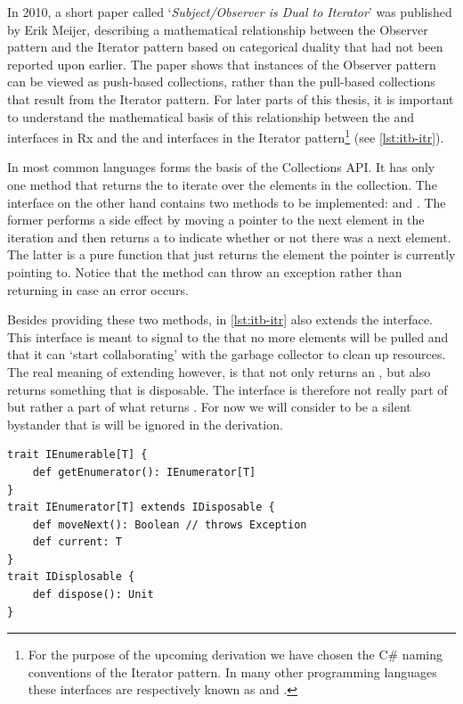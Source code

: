 In 2010, a short paper called `\textit{Subject/Observer is Dual to Iterator}' \cite{meijer2010-Observable} was published by Erik Meijer, describing a mathematical relationship between the Observer pattern and the Iterator pattern based on categorical duality that had not been reported upon earlier. The paper shows that instances of the Observer pattern can be viewed as push-based collections, rather than the pull-based collections that result from the Iterator pattern. For later parts of this thesis, it is important to understand the mathematical basis of this relationship between the \obs and \obv interfaces in Rx and the \ieb and \ier interfaces in the Iterator pattern\footnote{For the purpose of the upcoming derivation we have chosen the C\# naming conventions of the Iterator pattern. In many other programming languages these interfaces are respectively known as  and .} (see \autoref{lst:itb-itr}).

In most common languages \ieb forms the basis of the Collections API. It has only one method  that returns the \ier to iterate over the elements in the collection. The \ier interface on the other hand contains two methods to be implemented:  and . The former performs a side effect by moving a pointer to the next element in the iteration and then returns a  to indicate whether or not there was a next element. The latter is a pure function that just returns the element the pointer is currently pointing to. Notice that the  method can throw an exception rather than returning  in case an error occurs.

Besides providing these two methods, \ier in \autoref{lst:itb-itr} also extends the \id interface. This interface is meant to signal to the \ieb that no more elements will be pulled and that it can `start collaborating' with the garbage collector to clean up resources. The real meaning of \ier extending \id however, is that  not only returns an \ier, but also returns something that is disposable. The \id interface is therefore not really part of \ier but rather a part of what  returns \cite{E2E-Rx}. For now we will consider \id to be a silent bystander that is will be ignored in the derivation.

\begin{minipage}{\linewidth}
\begin{lstlisting}[style=ScalaStyle, caption={\ieb and \ier interfaces}, label={lst:itb-itr}]
trait IEnumerable[T] {
    def getEnumerator(): IEnumerator[T]
}
trait IEnumerator[T] extends IDisposable {
    def moveNext(): Boolean // throws Exception
    def current: T
}
trait IDisplosable {
    def dispose(): Unit
}
\end{lstlisting}
\end{minipage}

